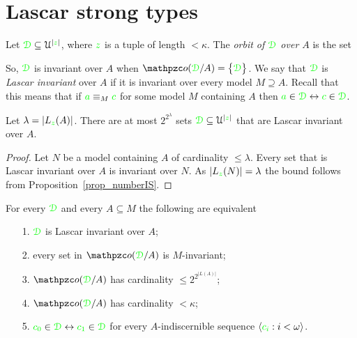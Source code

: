 \documentclass[creche.tex]{subfiles}
\begin{document}
\section{Lascar strong types}
\label{Lst}
\def\equivL{\stackrel{\smash{\scalebox{.5}{\rm L}}}{\equiv}}


Let ${\color{green}\EuScript D}\subseteq\EuScript U^{|{\color{green} z}|}$, where ${\color{green} z}$ is a tuple of length $<\kappa$. The \emph{orbit of ${\color{green}\EuScript D}$ over $A$\/} is the set


So, ${\color{green}\EuScript D}$ is invariant over $A$ when $\oorbit(\grD/A)=\big\{\grD\big\}$. We say that ${\color{green}\EuScript D}$ is \emph{Lascar invariant\/} over $A$ if it is invariant over every model $M\supseteq A$. Recall that this means that if ${\color{green} a}\equiv_M{\color{green} c}$ for some model $M$ containing $A$ then ${\color{green} a}\in{\color{green}\EuScript D}\leftrightarrow{\color{green}c}\in{\color{green}\EuScript D}$.


\begin{proposition}\label{prop_numero_quasi_invarianti}
  Let $\lambda=|L_{\color{green} z}(A)|$. There are at most $2^{2^{\lambda}}$ sets ${\color{green}\EuScript D}\subseteq\EuScript U^{|{\color{green} z}|}$ that are Lascar invariant over $A$.
\end{proposition}

\begin{proof}
  Let $N$ be a model containing $A$ of cardinality $\le\lambda$. Every set that is Lascar invariant over $A$ is invariant over $N$. As $|L_{\color{green} z}(N)|=\lambda$ the bound follows from Proposition~\ref{prop_numberIS}.
\end{proof}

\begin{theorem}\label{thm_Lascar_indiscernibles}
  For every ${\color{green}\EuScript D}$ and every $A\subseteq M$ the following are equivalent
  \begin{itemize}
    \item[1.] ${\color{green}\EuScript D}$ is Lascar invariant over $A$;
    \item[2.] every set in $\oorbit(\grD/A)$ is $M\mbox{-}$invariant;
    \item[3.] $\oorbit(\grD/A)$ has cardinality $\le 2^{2^{|L(A)|}}$;
    \item[4.] $\oorbit(\grD/A)$ has cardinality $<\kappa$;
    \item[5.] ${\color{green} c_0}\in{\color{green}\EuScript D}\leftrightarrow{\color{green}c_1}\in{\color{green}\EuScript D}$ for every $A\mbox{-}$indiscernible sequence $\langle{\color{green}c_i}:i<\omega\rangle$.
  \end{itemize}
\end{theorem}
\end{document}
